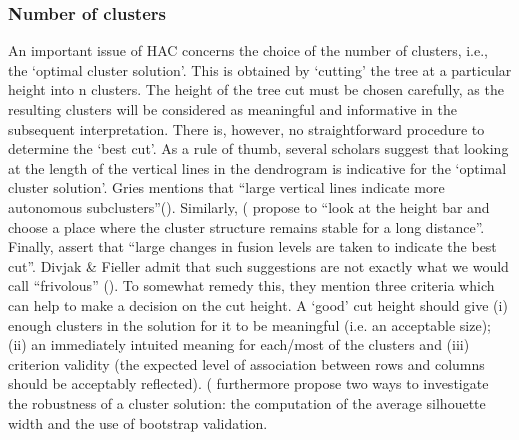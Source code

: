 \subsubsection{\label{sec:3.7.2.3}  Number of clusters}

An important issue of HAC concerns the choice of the number of clusters, i.e., the ‘optimal cluster solution’. This is obtained by ‘cutting’ the tree at a particular height into n clusters. The height of the tree cut must be chosen carefully, as the resulting clusters will be considered as meaningful and informative in the subsequent interpretation. There is, however, no straightforward procedure to determine the ‘best cut’. As a rule of thumb, several scholars suggest that looking at the length of the vertical lines in the dendrogram is indicative for the ‘optimal cluster solution’. Gries mentions that “large vertical lines indicate more autonomous subclusters”(\citeyear[338]{gries_statistics_2013}). Similarly, (\citet[430]{glynn_cluster_2014} propose to “look at the height bar and choose a place where the cluster structure remains stable for a long distance”. Finally, \citet[95]{everitt_cluster_2011} assert that “large changes in fusion levels are taken to indicate the best cut”. Divjak \& Fieller admit that such suggestions are not exactly what we would call “frivolous” (\citeyear[430]{glynn_cluster_2014}). To somewhat remedy this, they mention three criteria which can help to make a decision on the cut height. A ‘good’ cut height should give (i) enough clusters in the solution for it to be meaningful (i.e. an acceptable size); (ii) an immediately intuited meaning for each/most of the clusters and (iii) criterion validity (the expected level of association between rows and columns should be acceptably reflected). (\citet[432-433]{glynn_cluster_2014} furthermore propose two ways to investigate the robustness of a cluster solution: the computation of the average silhouette width and the use of bootstrap validation.



